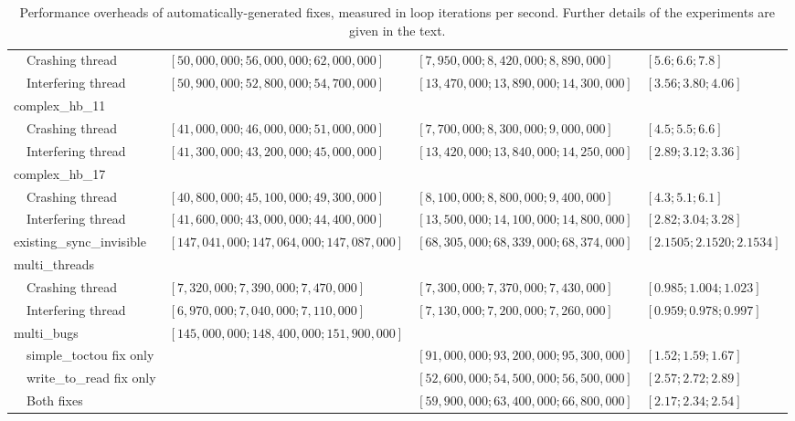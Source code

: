 \begin{sidewaystable}
{\begin{tabular}{|ll|l|l|l|}
    & \multicolumn{1}{l|}{Crashing thread} & $[50,\!000,\!000; 56,\!000,\!000; 62,\!000,\!000]$  &  $[7,\!950,\!000; 8,\!420,\!000; 8,\!890,\!000]$  &  $[5.6; 6.6; 7.8]$ \\
    & \multicolumn{1}{l|}{Interfering thread} & $[50,\!900,\!000; 52,\!800,\!000; 54,\!700,\!000]$  &  $[13,\!470,\!000; 13,\!890,\!000; 14,\!300,\!000]$  &  $[3.56; 3.80; 4.06]$ \\
    \multicolumn{2}{|l|}{complex\_hb\_11               } & & & \\
    & \multicolumn{1}{l|}{Crashing thread} & $[41,\!000,\!000; 46,\!000,\!000; 51,\!000,\!000]$  &  $[7,\!700,\!000; 8,\!300,\!000; 9,\!000,\!000]$  &  $[4.5; 5.5; 6.6]$ \\
    & \multicolumn{1}{l|}{Interfering thread} & $[41,\!300,\!000; 43,\!200,\!000; 45,\!000,\!000]$  &  $[13,\!420,\!000; 13,\!840,\!000; 14,\!250,\!000]$  &  $[2.89; 3.12; 3.36]$ \\
    \multicolumn{2}{|l|}{complex\_hb\_17               } & & & \\
    & \multicolumn{1}{l|}{Crashing thread} & $[40,\!800,\!000; 45,\!100,\!000; 49,\!300,\!000]$  &  $[8,\!100,\!000; 8,\!800,\!000; 9,\!400,\!000]$  &  $[4.3; 5.1; 6.1]$ \\
    & \multicolumn{1}{l|}{Interfering thread} & $[41,\!600,\!000; 43,\!000,\!000; 44,\!400,\!000]$  &  $[13,\!500,\!000; 14,\!100,\!000; 14,\!800,\!000]$  &  $[2.82; 3.04; 3.28]$ \\
    \multicolumn{2}{|l|}{existing\_sync\_invisible     }  & $[147,\!041,\!000; 147,\!064,\!000; 147,\!087,\!000]$  &  $[68,\!305,\!000; 68,\!339,\!000; 68,\!374,\!000]$  &  $[2.1505; 2.1520; 2.1534]$ \\
    \multicolumn{2}{|l|}{multi\_threads                } & & & \\
    & \multicolumn{1}{l|}{Crashing thread} & $[7,\!320,\!000; 7,\!390,\!000; 7,\!470,\!000]$  &  $[7,\!300,\!000; 7,\!370,\!000; 7,\!430,\!000]$  &  $[0.985; 1.004; 1.023]$ \\
    & \multicolumn{1}{l|}{Interfering thread} & $[6,\!970,\!000; 7,\!040,\!000; 7,\!110,\!000]$  &  $[7,\!130,\!000; 7,\!200,\!000; 7,\!260,\!000]$  &  $[0.959; 0.978; 0.997]$ \\
    \multicolumn{2}{|l|}{multi\_bugs} & $[145,\!000,\!000; 148,\!400,\!000; 151,\!900,\!000]$ & & \\
    & simple\_toctou fix only & & $[91,\!000,\!000; 93,\!200,\!000; 95,\!300,\!000]$  &  $[1.52; 1.59; 1.67]$ \\
    & write\_to\_read fix only & & $[52,\!600,\!000; 54,\!500,\!000; 56,\!500,\!000]$  &  $[2.57; 2.72; 2.89]$\\
    & Both fixes & &  $[59,\!900,\!000; 63,\!400,\!000; 66,\!800,\!000]$  &  $[2.17; 2.34; 2.54]$ \\
    \hline
  \end{tabular}
  }
  \caption{Performance overheads of automatically-generated fixes,
    measured in loop iterations per second.  Further details of the
    experiments are given in the text.}
  \label{table:eval:fix_overheads}
\end{sidewaystable}

